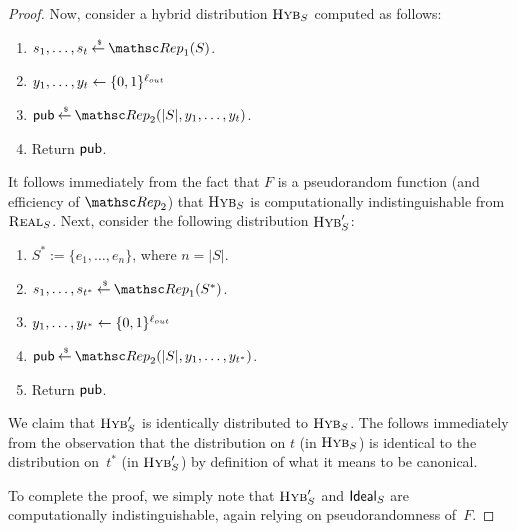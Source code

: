 \begin{proof}
Now, consider a hybrid distribution $\mbox{{\sc Hyb}}_S$ computed as follows:
\begin{enumerate}
\item $s_1, \ldots, s_t \getsr \Rep_1(S)$.
\item $y_1, \ldots, y_t \leftarrow \{0,1\}^{\ell_{out}}$
\item $\pubaux \getsr \Rep_2(|S|, y_1, \ldots, y_t)$.
\item Return ${\sf pub}$.
\end{enumerate}
It follows immediately from the fact that $F$ is a pseudorandom function (and efficiency
of $\Rep_2$) that $\mbox{{\sc Hyb}}_S$ is computationally indistinguishable from $\mbox{{\sc Real}}_S$.
Next, consider the following distribution $\mbox{{\sc Hyb}}'_S$:
\begin{enumerate}
\item $S^* := \{e_1, \ldots, e_n\}$, where $n = |S|$.
\item $s_1, \ldots, s_{t^*} \getsr \Rep_1(S^*)$.
\item $y_1, \ldots, y_{t^*} \leftarrow \{0,1\}^{\ell_{out}}$
\item $\pubaux \getsr \Rep_2(|S|, y_1, \ldots, y_{t^*})$.
\item Return ${\sf pub}$.
\end{enumerate}
We claim that $\mbox{{\sc Hyb}}'_S$ is identically distributed to $\mbox{{\sc Hyb}}_S$. The follows immediately from the
observation that the distribution on $t$ (in $\mbox{{\sc Hyb}}_S$) is identical to the distribution on~$t^*$
(in $\mbox{{\sc Hyb}}'_S$) by definition
of what it means to be canonical.

To complete the proof, we simply note that $\mbox{{\sc Hyb}}'_S$ and $\mbox{{\sf Ideal}}_S$
are computationally indistinguishable, again relying on pseudorandomness of~$F$.
\end{proof}

%

